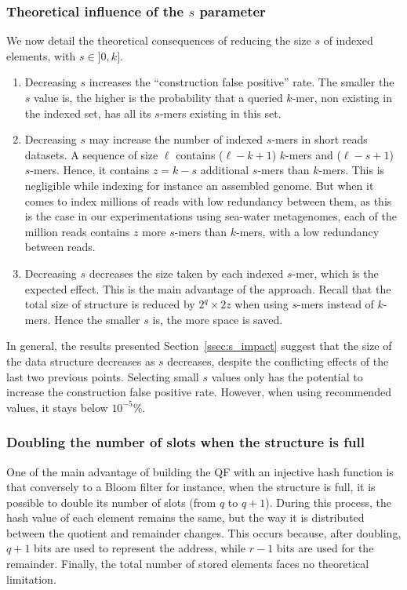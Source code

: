 \subsubsection{Theoretical influence of the $s$ parameter}\label{ssec:s_influence}
We now detail the theoretical consequences of reducing the size $s$ of indexed elements, with $s \in ]0, k]$. 
\begin{enumerate}
    \item Decreasing $s$ increases the ``construction false positive'' rate.
    The smaller the $s$ value is, the higher is the probability that a queried $k$-mer, non existing in the indexed set, has all its $s$-mers existing in this set. 
    \item Decreasing $s$ may increase the number of indexed $s$-mers in short reads datasets. A sequence of size $\ell$ contains ($\ell-k+1$) $k$-mers and ($\ell-s+1$) $s$-mers. Hence, it contains $z=k-s$ additional $s$-mers than $k$-mers. This is negligible while indexing for instance an assembled genome.
    But when it comes to index millions of reads with low redundancy between them, as this is the case in our experimentations using sea-water metagenomes, each of the million reads contains $z$ more $s$-mers than $k$-mers, with a low redundancy between reads.
    \item Decreasing $s$ decreases the size taken by each indexed $s$-mer, which is the expected effect. This is the main advantage of the approach. Recall that the total size of structure is reduced by $2^q \times 2z$ when using $s$-mers instead of $k$-mers. Hence the smaller $s$ is, the more space is saved.
\end{enumerate}

In general, the results presented Section~\ref{ssec:s_impact} suggest that the size of the data structure decreases as $s$ decreases, despite the conflicting effects of the last two previous points. Selecting small $s$ values only has the potential to increase the construction false positive rate. However, when using recommended values, it stays below $10^{-5}\%$. 

\subsubsection{Doubling the number of slots when the structure is full}\label{sssec:full}
One of the main advantage of building the QF with an injective hash function is that conversely to a Bloom filter for instance, when the structure is full, it is possible to double its number of slots (from $q$ to $q+1$).
During this process, the hash value of each element remains the same, but the way it is distributed between the quotient and remainder changes. This occurs because, after doubling, $q+1$ bits are used to represent the address, while $r-1$ bits are used for the remainder.
Finally, the total number of stored elements faces no theoretical limitation.

